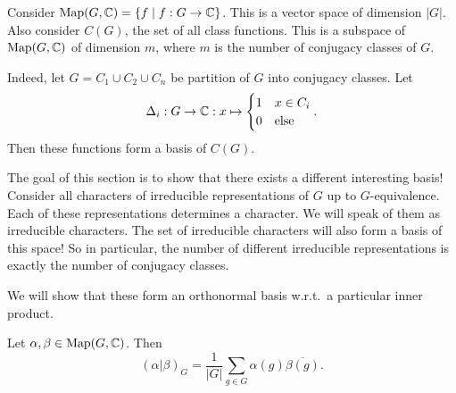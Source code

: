 
Consider $\operatorname{Map}(G, \mathbb{C}) = \{f  \mid  f : G \to  \mathbb{C}\}$.
This is a vector space of dimension $|G|$.
Also consider $C(G)$, the set of all class functions. This is a subspace of $ \operatorname{Map}(G, \mathbb{C})$ of dimension $m$, where $m$ is the number of conjugacy classes of $G$.

Indeed, let $G = C_1 \cup  C_2 \cup C_n$ be partition of $G$ into conjugacy classes.
Let
\[
\Delta_i : G \to  \mathbb{C}: x \mapsto  \begin{cases}
    1 & x \in C_i\\
    0 & \text{else}
\end{cases}
.\] 
Then these functions form a basis of $C(G)$.

The goal of this section is to show that there exists a different interesting basis!
Consider all characters of irreducible representations of $G$ up to $G$-equivalence.
Each of these representations determines a character. We will speak of them as irreducible characters.
The set of irreducible characters will also form a basis of this space!
So in particular, the number of different irreducible representations is exactly the number of conjugacy classes.

We will show that these form an orthonormal basis w.r.t.\ a particular inner product.


\begin{definition}
    Let $\alpha, \beta \in \operatorname{Map}(G, \mathbb{C})$. Then
    \[
        (\alpha|\beta)_G = \frac{1}{|G|} \sum_{g \in G} \alpha(g) \overline{\beta(g)}
    .\] 
\end{definition}

